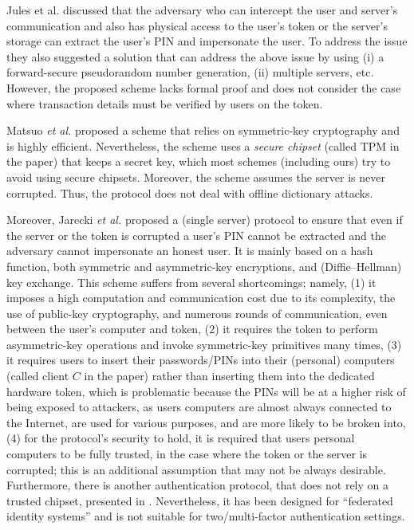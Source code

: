 \begin{enumerate}

Jules et al. \cite{juels2016configurable} discussed that the adversary who can intercept the user and server's communication and also has physical access to the user's token or the server's storage can extract the user's PIN and impersonate the user. To address the issue they also suggested a solution that can address the above issue by using (i) a forward-secure pseudorandom number generation, (ii) multiple servers, etc. However, the proposed scheme lacks formal proof and does not consider the case where transaction details must be verified by users on the token.  


Matsuo \textit{et al.} \cite{MatsuoMY11} proposed a scheme that relies on symmetric-key cryptography and is highly efficient. Nevertheless, the scheme uses a \emph{secure chipset} (called TPM in the paper) that keeps a secret key, which most schemes (including ours) try to avoid using secure chipsets. Moreover, the scheme assumes the server is never corrupted. Thus, the protocol does not deal with offline dictionary attacks. 




Moreover, Jarecki \textit{et al.} \cite{JareckiJKSS21} proposed a (single server) protocol to ensure that even if the server or the token is corrupted a user's PIN cannot be extracted and the adversary cannot impersonate an honest user. It is mainly based on a hash function, both symmetric and asymmetric-key encryptions, and (Diffie–Hellman) key exchange. This scheme suffers from several shortcomings; namely, (1) it imposes a high computation and communication cost due to its complexity,  the use of public-key cryptography, and numerous rounds of communication, even between the user's computer and token, (2) it requires the token to perform asymmetric-key operations and invoke symmetric-key primitives many times, (3) it requires users to insert their passwords/PINs into their (personal) computers (called client $C$ in the paper) rather than inserting them into the dedicated hardware token, which is problematic because the PINs will be at a higher risk of being exposed to attackers, as users computers are almost always connected to the Internet, are used for various purposes, and are more likely to be broken into, (4) for the protocol's security to hold, it is required that users personal computers to be fully trusted, in the case where the token or the server is corrupted; this is an additional assumption that may not be always desirable. %
%
%
Furthermore, there is another authentication protocol, that does not rely on a trusted chipset, presented in \cite{zhang2020strong}. Nevertheless, it has been designed for ``federated identity systems'' and is not suitable for two/multi-factor authentication settings. 




\end{enumerate}
